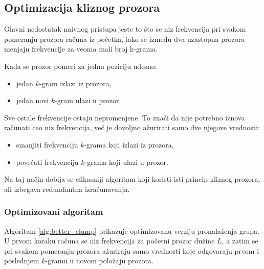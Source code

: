 \documentclass[12pt,oneside]{memoir}
\begin{document}
\subsection{Optimizacija kliznog prozora}

Glavni nedostatak naivnog pristupa jeste to što se niz frekvencija pri svakom pomeranju prozora računa iz početka, iako se između dva uzastopna prozora menjaju frekvencije za veoma mali broj k-grama.

Kada se prozor pomeri za jednu poziciju udesno:
\begin{itemize}
    \item jedan $k$-gram izlazi iz prozora,
    \item jedan novi $k$-gram ulazi u prozor.
\end{itemize}

Sve ostale frekvencije ostaju nepromenjene. To znači da nije potrebno iznova računati ceo niz frekvencija, već je dovoljno ažurirati samo dve njegove vrednosti:
\begin{itemize}
    \item smanjiti frekvenciju $k$-grama koji izlazi iz prozora,
    \item povećati frekvenciju $k$-grama koji ulazi u prozor.
\end{itemize}

Na taj način dobija se efikasniji algoritam koji koristi isti princip kliznog prozora, ali izbegava redundantna izračunavanja.

\subsubsection{Optimizovani algoritam}

Algoritam \ref{alg:better_clump} prikazuje optimizovanu verziju pronalaženja grupa. U prvom koraku računa se niz frekvencija za početni prozor dužine $L$, a zatim se pri svakom pomeranju prozora ažuriraju samo vrednosti koje odgovaraju prvom i poslednjem $k$-gramu u novom položaju prozora.
\end{document}

